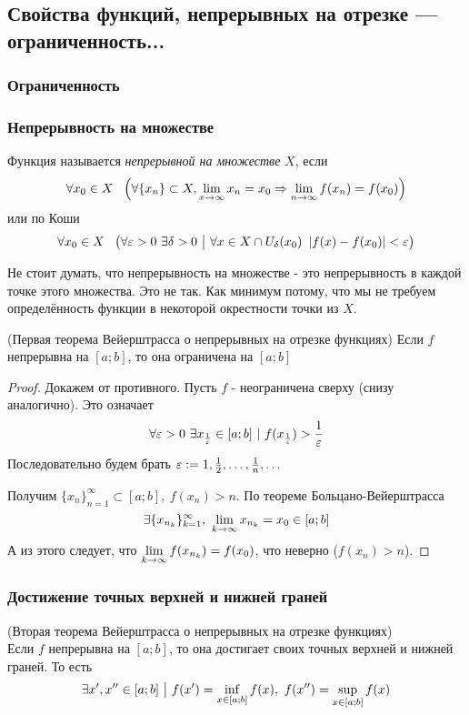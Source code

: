\subsection{Свойства функций, непрерывных на отрезке — ограниченность... }
\subsubsection{Ограниченность}
\subsubsection*{Непрерывность на множестве}

\begin{definition}
	Функция называется \textit{непрерывной на множестве} $X$, если 
	\[
		\forall x_0 \in X\ \ \left(\forall \{x_n\} \subset X, \lim\limits_{x \to \infty} x_n = x_0 \Rightarrow \lim\limits_{n \to \infty} f(x_n) = f(x_0)\right)
	\]
	или по Коши
	\[
		\forall x_0 \in X\ \ \left(\forall \eps > 0\ \exists \delta > 0 \such \forall x \in X \cap U_\delta(x_0)\ \left|f(x) - f(x_0)\right| < \eps\right)
	\]
\end{definition}

\begin{note}
	Не стоит думать, что непрерывность на множестве - это непрерывность в каждой точке этого множества. Это не так. Как минимум потому, что мы не требуем определённость функции в некоторой окрестности точки из $X$.
\end{note}

\begin{theorem} (Первая теорема Вейерштрасса о непрерывных на отрезке функциях)
	Если $f$ непрерывна на $[a; b]$, то она ограничена на $[a; b]$
\end{theorem}

\begin{proof}
	Докажем от противного. Пусть $f$ - неограничена сверху (снизу аналогично). Это означает
	$$
		\forall \varepsilon > 0\ \exists x_{\frac{1}{\varepsilon}} \in [a; b]\ |\ f(x_{\frac{1}{\varepsilon}}) > \frac{1}{\varepsilon}
	$$
	Последовательно будем брать $\varepsilon := 1, \frac{1}{2}, \dots, \frac{1}{n}, \dots$
	
	Получим $\{x_n\}_{n = 1}^\infty \subset [a; b],\ f(x_n) > n$. По теореме Больцано-Вейерштрасса
	$$
		\exists \{x_{n_k}\}_{k = 1}^\infty,\ \lim\limits_{k \to \infty} x_{n_k} = x_0 \in [a; b]
	$$
	А из этого следует, что $\lim\limits_{k \to \infty} f(x_{n_k}) = f(x_0)$, что неверно ($f(x_n) > n$).
\end{proof}

\subsubsection{Достижение точных верхней и нижней граней}
\begin{theorem} (Вторая теорема Вейерштрасса о непрерывных на отрезке функциях) \\
	Если $f$ непрерывна на $[a; b]$, то она достигает своих точных верхней и нижней граней. То есть
	$$
		\exists x', x'' \in [a; b] \ \big|\  f(x') = \inf\limits_{x \in [a; b]} f(x),\ f(x'') = \sup\limits_{x \in [a; b]} f(x)
	$$
\end{theorem}

